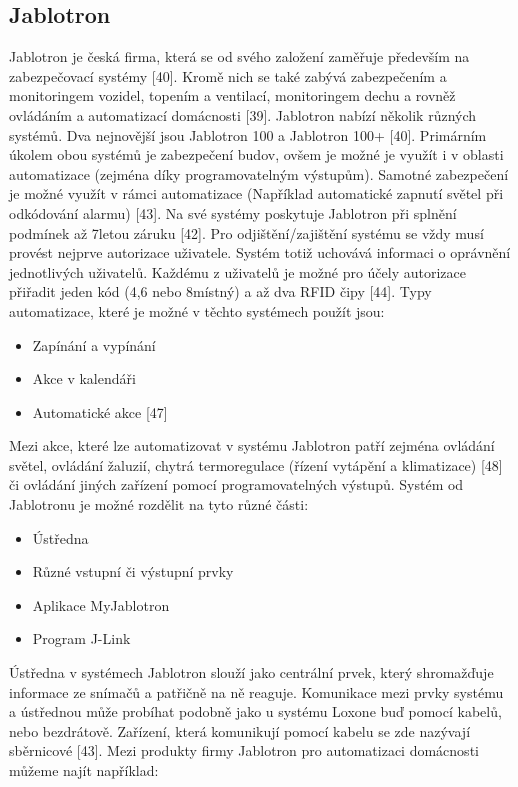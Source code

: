 \subsection*{Jablotron}
Jablotron je česká firma, která se od svého založení zaměřuje především na zabezpečovací systémy [40]. Kromě nich se také zabývá zabezpečením a monitoringem vozidel, topením a ventilací, monitoringem dechu a rovněž ovládáním a automatizací domácnosti [39]. \newline
Jablotron nabízí několik různých systémů. Dva nejnovější jsou Jablotron 100 a Jablotron 100+ [40]. Primárním úkolem obou systémů je zabezpečení budov, ovšem je možné je využít i v oblasti automatizace (zejména díky programovatelným výstupům). Samotné zabezpečení je možné využít v rámci automatizace (Například automatické zapnutí světel při odkódování alarmu) [43]. \newline
Na své systémy poskytuje Jablotron při splnění podmínek až 7letou záruku [42]. \newline
Pro odjištění/zajištění systému se vždy musí provést nejprve autorizace uživatele. Systém totiž uchovává informaci o oprávnění jednotlivých uživatelů. Každému z uživatelů je možné pro účely autorizace přiřadit jeden kód (4,6 nebo 8místný) a až dva RFID čipy [44]. \newline
 Typy automatizace, které je možné v těchto systémech použít jsou:
 \begin{itemize}
     \item Zapínání a vypínání
     \item Akce v kalendáři 
     \item Automatické akce [47]
 \end{itemize}
Mezi akce, které lze automatizovat v systému Jablotron patří zejména ovládání světel, ovládání žaluzií, chytrá termoregulace (řízení vytápění a klimatizace) [48] či ovládání jiných zařízení pomocí programovatelných výstupů. \newline
Systém od Jablotronu je možné rozdělit na tyto různé části:
\begin{itemize}
    \item Ústředna
    \item Různé vstupní či výstupní prvky
    \item Aplikace MyJablotron
    \item Program J-Link
\end{itemize}
Ústředna v systémech Jablotron slouží jako centrální prvek, který shromažďuje informace ze snímačů a patřičně na ně reaguje. Komunikace mezi prvky systému a ústřednou může probíhat podobně jako u systému Loxone buď pomocí kabelů, nebo bezdrátově. Zařízení, která komunikují pomocí kabelu se zde nazývají sběrnicové [43].\newline
Mezi produkty firmy Jablotron pro automatizaci domácnosti můžeme najít například:

